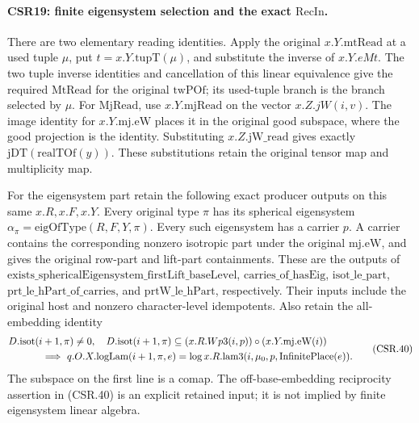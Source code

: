 \paragraph{CSR19: finite eigensystem selection and the exact \(\mathrm{RecIn}\).}
\label{claim:CSR19}
There are two elementary reading identities. Apply the
original \(x.Y.\mathrm{mtRead}\) at a used tuple \(\mu\),
put \(t=x.Y.\mathrm{tupT}(\mu)\), and substitute the inverse
of \(x.Y.eMt\). The two tuple inverse identities and
cancellation of this linear equivalence give the required
\(\mathrm{MtRead}\) for the original \(\mathrm{twPOf}\);
its used-tuple branch is the branch selected by \(\mu\).
For \(\mathrm{MjRead}\), use \(x.Y.\mathrm{mjRead}\) on
the vector \(x.Z.jW(i,v)\). The image identity for
\(x.Y.\mathrm{mj.eW}\) places it in the original good
subspace, where the good projection is the identity.
Substituting \(x.Z.\mathrm{jW\_read}\) gives exactly
\(\mathrm{jDT}(\mathrm{realTOf}(y))\). These substitutions
retain the original tensor map and multiplicity map.

For the eigensystem part retain the following exact
producer outputs on this same \(x.R,x.F,x.Y\). Every
original type \(\pi\) has its spherical eigensystem
\(\alpha_\pi=\mathrm{eigOfType}(R,F,Y,\pi)\).
Every such eigensystem has a carrier \(p\).
A carrier contains the corresponding nonzero isotropic
part under the original \(\mathrm{mj.eW}\), and gives
the original row-part and lift-part containments.
These are the outputs of
\(\mathrm{exists\_sphericalEigensystem\_firstLift\_baseLevel}\),
\(\mathrm{carries\_of\_hasEig}\),
\(\mathrm{isot\_le\_part}\),
\(\mathrm{prt\_le\_hPart\_of\_carries}\), and
\(\mathrm{prtW\_le\_hPart}\), respectively.
Their inputs include the original host and nonzero
character-level idempotents. Also retain the all-embedding
identity
\[
 \begin{split}
 &D.\mathrm{isot}(i+1,\pi)\ne0,\quad
 D.\mathrm{isot}(i+1,\pi)
       \subseteq (x.R.Wp3(i,p))\circ(x.Y.\mathrm{mj.eW}(i))
 \\
 &\hspace{12mm}\Longrightarrow\
 q.O.X.\mathrm{logLam}(i+1,\pi,e)
   =\log x.R.\mathrm{lam3}(i,\mu_0,p,\mathrm{InfinitePlace}(e)).
 \end{split}
 \tag{CSR.40}
\]
The subspace on the first line is a comap. The
off-base-embedding reciprocity assertion in (CSR.40) is
an explicit retained input; it is not implied by finite
eigensystem linear algebra.

